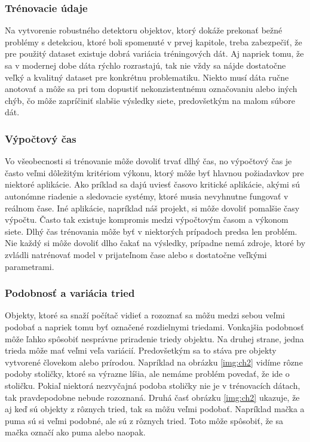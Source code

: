\subsubsection{Trénovacie údaje}
Na vytvorenie robustného detektoru objektov, ktorý dokáže prekonať bežné problémy s detekciou, ktoré boli spomenuté v prvej kapitole, treba zabezpečiť, že pre použitý dataset existuje dobrá variácia tréningových dát. Aj napriek tomu, že sa v modernej dobe dáta rýchlo rozrastajú, tak nie vždy sa nájde dostatočne veľký a kvalitný dataset pre konkrétnu problematiku. Niekto musí dáta ručne anotovať a môže sa pri tom dopustiť nekonzistentnému označovaniu alebo iných chýb, čo môže zapríčiniť slabšie výsledky siete, predovšetkým na malom súbore dát.

\subsubsection{Výpočtový čas}
Vo všeobecnosti si trénovanie môže dovoliť trvať dlhý čas, no výpočtový čas je často veľmi dôležitým kritériom výkonu, ktorý môže byť hlavnou požiadavkov pre niektoré aplikácie. Ako príklad sa dajú uviesť časovo kritické aplikácie, akými sú autonómne riadenie a sledovacie systémy, ktoré musia nevyhnutne fungovať v reálnom čase. Iné aplikácie, napríklad náš projekt, si môže dovoliť pomalšie časy výpočtu. Často tak existuje kompromis medzi výpočtovým časom a výkonom siete. Dlhý čas trénovania môže byť v niektorých prípadoch predsa len problém. Nie každý si môže dovoliť dlho čakať na výsledky, prípadne nemá zdroje, ktoré by zvládli natrénovať model v prijateľnom čase alebo s dostatočne veľkými parametrami.

\subsubsection{Podobnosť a variácia tried}
Objekty, ktoré sa snaží počítač vidieť a rozoznať sa môžu medzi sebou veľmi podobať a napriek tomu byť označené rozdielnymi triedami. Vonkajšia podobnosť môže ľahko spôsobiť nesprávne priradenie triedy objektu. Na druhej strane, jedna trieda môže mať veľmi veľa variácií. Predovšetkým sa to stáva pre objekty vytvorené človekom alebo prírodou. Napríklad na obrázku \ref{img:ch2} vidíme rôzne podoby stoličky, ktoré sa výrazne líšia, ale nemáme problém povedať, že ide o stoličku. Pokiaľ niektorá nezvyčajná podoba stoličky nie je v trénovacích dátach, tak pravdepodobne nebude rozoznaná. Druhá časť obrázku \ref{img:ch2} ukazuje, že aj keď sú objekty z rôznych tried, tak sa môžu veľmi podobať. Napríklad mačka a puma sú si veľmi podobné, ale sú z rôznych tried. Toto môže spôsobiť, že sa mačka označí ako puma alebo naopak.

